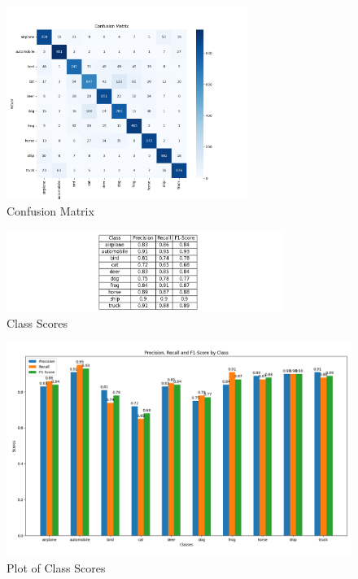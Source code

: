 \documentclass{article}
\begin{document}
\begin{figure}[H]
\centering
\includegraphics[width=0.7\textwidth]{analysis.png}
\caption{Confusion Matrix}
\label{fig:confusion_matrix}
\end{figure}

\begin{figure}[H]
\centering
\includegraphics[width=0.8\textwidth]{table.png}
\caption{Class Scores}
\label{fig:class_scores}
\end{figure}

\begin{figure}[H]
\centering
\includegraphics[width=1\textwidth]{scores.png}
\caption{Plot of Class Scores}
\label{fig:scores_plot}
\end{figure}

\end{document}
